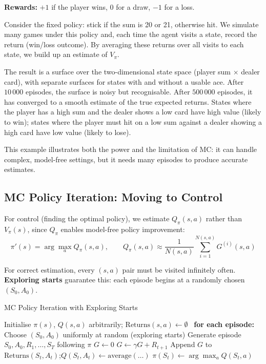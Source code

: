 \documentclass[11pt,a4paper]{article}
\newcommand{\term}[1]{\textcolor{DefGreen}{\textbf{#1}}}
\begin{document}
\textbf{Rewards:} $+1$ if the player wins, $0$ for a draw, $-1$ for a loss.

Consider the fixed policy: stick if the sum is 20 or 21, otherwise hit. We simulate many games under this policy and, each time the agent visits a state, record the return (win/loss outcome). By averaging these returns over all visits to each state, we build up an estimate of $V_\pi$.

The result is a surface over the two-dimensional state space (player sum $\times$ dealer card), with separate surfaces for states with and without a usable ace. After $10\,000$ episodes, the surface is noisy but recognisable. After $500\,000$ episodes, it has converged to a smooth estimate of the true expected returns. States where the player has a high sum and the dealer shows a low card have high value (likely to win); states where the player must hit on a low sum against a dealer showing a high card have low value (likely to lose).

This example illustrates both the power and the limitation of MC: it can handle complex, model-free settings, but it needs many episodes to produce accurate estimates.

\subsection{MC Policy Iteration: Moving to Control}

For control (finding the optimal policy), we estimate $Q_\pi(s,a)$ rather than $V_\pi(s)$, since $Q_\pi$ enables model-free policy improvement:
\[
\pi'(s) = \arg\max_a Q_\pi(s,a), \qquad Q_\pi(s,a) \approx \frac{1}{N(s,a)}\sum_{i=1}^{N(s,a)} G^{(i)}(s,a)
\]

For correct estimation, every $(s,a)$ pair must be visited infinitely often. \term{Exploring starts} guarantee this: each episode begins at a randomly chosen $(S_0,A_0)$.

\begin{algobox}[breakable]{MC Policy Iteration with Exploring Starts}
\begin{algorithmic}[1]
\State Initialise $\pi(s)$, $Q(s,a)$ arbitrarily; $\text{Returns}(s,a)\leftarrow\emptyset$
\Loop\ \textbf{for each episode:}
  \State Choose $(S_0,A_0)$ uniformly at random (exploring starts)
  \State Generate episode $S_0,A_0,R_1,\ldots,S_T$ following $\pi$
  \State $G\leftarrow 0$
    \State $G\leftarrow\gamma G+R_{t+1}$
      \State Append $G$ to $\text{Returns}(S_t,A_t)$;\quad $Q(S_t,A_t)\leftarrow\text{average}(\ldots)$
    \EndIf
    \State $\pi(S_t)\leftarrow\arg\max_a Q(S_t,a)$
  \EndFor
\EndLoop
\end{algorithmic}
\end{algobox}
\end{document}
